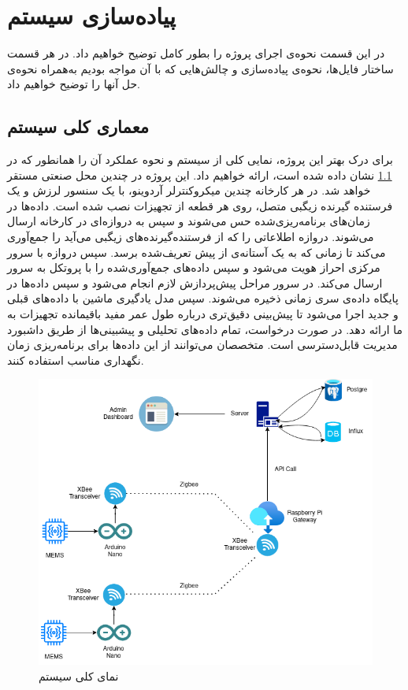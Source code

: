 \chapter{پیاده‌سازی سیستم}

در این قسمت نحوه‌ی اجرای پروژه را بطور کامل توضیح خواهیم داد. در هر قسمت ساختار فایل‌ها، نحوه‌ی پیاده‌سازی و چالش‌هایی که با آن مواجه بودیم به‌همراه نحوه‌ی حل آنها را توضیح خواهیم داد.

\section{معماری کلی سیستم}

برای درک بهتر این پروژه، نمایی کلی از سیستم و نحوه عملکرد آن را همانطور که در \cref{fig:system_overview} نشان داده شده است، ارائه خواهیم داد. این پروژه در چندین محل صنعتی مستقر خواهد شد. در هر کارخانه چندین میکروکنترلر آردوینو، با یک سنسور لرزش و یک فرستنده گیرنده زیگبی متصل، روی هر قطعه از تجهیزات نصب شده است. داده‌ها در زمان‌های برنامه‌ریزی‌شده حس می‌شوند و سپس به دروازه‌ای در کارخانه ارسال می‌شوند. دروازه اطلاعاتی را که از فرستنده‌گیرنده‌های زیگبی می‌آید را جمع‌آوری می‌کند تا زمانی که به یک آستانه‌ی از پیش تعریف‌شده برسد. سپس دروازه با سرور مرکزی احراز هویت می‌شود و سپس داده‌های جمع‌آوری‌شده را با پروتکل  به سرور ارسال می‌کند. در سرور مراحل پیش‌پردازش لازم انجام می‌شود و سپس داده‌ها در پایگاه داده‌ی سری زمانی ذخیره می‌شوند. سپس مدل یادگیری ماشین با داده‌های قبلی و جدید اجرا می‌شود تا پیش‌بینی دقیق‌تری درباره طول عمر مفید باقیمانده تجهیزات به ما ارائه دهد. در صورت درخواست، تمام داده‌های تحلیلی و پیشبینی‌ها از طریق داشبورد مدیریت قابل‌دسترسی است. متخصصان می‌توانند از این داده‌ها برای برنامه‌ریزی زمان نگهداری مناسب استفاده کنند.

\begin{figure}[!h]
\centering\includegraphics[scale=.6]{system_overview.png}
\caption{نمای کلی سیستم}\label{fig:system_overview}
\end{figure}